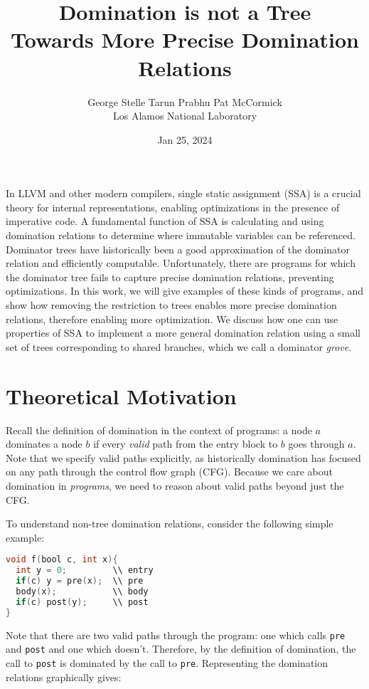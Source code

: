 \documentclass[a4paper,twocolumn]{article}
\title{Domination is not a Tree \\
\Large{Towards More Precise Domination Relations}}
\date{Jan 25, 2024}
\author{George Stelle \; Tarun Prabhu \; Pat McCormick \\ Los Alamos National Laboratory}
\begin{document}
\maketitle

In LLVM and other modern compilers, single static assignment (SSA) is a crucial
theory for internal representations, enabling optimizations in the presence of
imperative code. A fundamental function of SSA is calculating and using
domination relations to determine where immutable variables can be referenced.
Dominator trees have historically been a good approximation of the dominator
relation and efficiently computable. Unfortunately, there are programs for
which the dominator tree fails to capture precise domination relations,
preventing optimizations. In this work, we will give examples of these kinds of
programs, and show how removing the restriction to trees enables more precise
domination relations, therefore enabling more optimization. We discuss how one
can use properties of SSA to implement a more general domination relation using
a small set of trees corresponding to shared branches, which we call a
dominator \emph{grove}. 

\section*{Theoretical Motivation}
Recall the definition of domination in the context of programs: a node $a$
dominates a node $b$ if every \emph{valid} path from the entry block to $b$ goes
through $a$. Note that we specify valid paths explicitly, as historically
domination has focused on any path through the control flow graph (CFG).
Because we care about domination in \emph{programs}, we need to reason about
valid paths beyond just the CFG. 

To understand non-tree domination relations, consider the following simple
example: 
\begin{minipage}{\linewidth}
\begin{lstlisting}[language=C]
void f(bool c, int x){
  int y = 0;         \\ entry
  if(c) y = pre(x);  \\ pre
  body(x);           \\ body	
  if(c) post(y);     \\ post
}
\end{lstlisting}
\end{minipage}
Note that there are two valid paths through the program: one which calls
\texttt{pre} and \texttt{post} and one which doesn't. Therefore, by the
definition of domination, the call to \texttt{post} is dominated by the call to
\texttt{pre}. Representing the domination relations graphically gives: 
\begin{center}
\end{center} 
\end{document}
